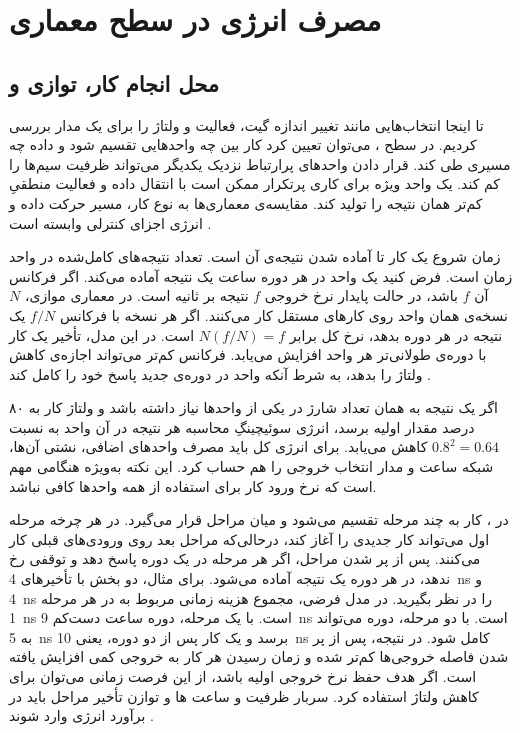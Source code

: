 \section{مصرف انرژی در سطح معماری}
\label{sec:power-architecture}

\subsection{محل انجام کار، توازی و }
\label{sec:power-parallelism-pipeline}

تا اینجا انتخاب‌هایی مانند تغییر اندازه گیت، فعالیت و ولتاژ را
برای یک مدار بررسی کردیم. در سطح ، می‌توان
تعیین کرد کار بین چه واحدهایی تقسیم شود و داده چه مسیری طی کند.
قرار دادن واحدهای پرارتباط نزدیک یکدیگر می‌تواند ظرفیت سیم‌ها را
کم کند. یک واحد ویژه برای کاری پرتکرار ممکن است با انتقال داده
و فعالیت منطقیِ کم‌تر همان نتیجه را تولید کند. مقایسه‌ی معماری‌ها
به نوع کار، مسیر حرکت داده و انرژی اجزای کنترلی وابسته است
\cite[بخش ، صفحه ۲۰۴]{weste}.

 زمان شروع یک کار تا آماده شدن نتیجه‌ی آن است.
 تعداد نتیجه‌های کامل‌شده در واحد زمان است. فرض
کنید یک واحد در هر دوره ساعت یک نتیجه آماده می‌کند. اگر فرکانس آن
\(f\) باشد، در حالت پایدار نرخ خروجی \(f\) نتیجه بر ثانیه است.
در معماری موازی، \(N\) نسخه‌ی همان واحد روی کارهای مستقل کار
می‌کنند. اگر هر نسخه با فرکانس \(f/N\) یک نتیجه در هر دوره
بدهد، نرخ کل برابر \(N(f/N)=f\) است. در این مدل، تأخیر یک کار
با دوره‌ی طولانی‌تر هر واحد افزایش می‌یابد. فرکانس کم‌تر می‌تواند
اجازه‌ی کاهش ولتاژ را بدهد، به شرط آنکه واحد در دوره‌ی جدید پاسخ
خود را کامل کند \cite[بخش  و شکل
، صفحات ۲۰۴ و ۲۰۵]{weste}.

اگر یک نتیجه به همان تعداد شارژ در یکی از واحدها نیاز داشته باشد
و ولتاژ کار به ۸۰ درصد مقدار اولیه برسد، انرژی سوئیچینگِ محاسبه هر
نتیجه در آن واحد به نسبت \(0.8^2=0.64\) کاهش می‌یابد. برای انرژی
کل باید مصرف واحدهای اضافی، نشتی آن‌ها، شبکه ساعت و مدار انتخاب
خروجی را هم حساب کرد. این نکته به‌ویژه هنگامی مهم است که نرخ ورود
کار برای استفاده از همه واحدها کافی نباشد.

در ، کار به چند مرحله تقسیم می‌شود و میان مراحل
 قرار می‌گیرد. در هر چرخه مرحله اول می‌تواند کار
جدیدی را آغاز کند، درحالی‌که مراحل بعد روی ورودی‌های قبلی کار
می‌کنند. پس از پر شدن مراحل، اگر هر مرحله در یک دوره پاسخ دهد
و توقفی رخ ندهد، در هر دوره یک نتیجه آماده می‌شود. برای مثال،
دو بخش با تأخیرهای \qty{4}{\nano\second} و
\qty{4}{\nano\second} را در نظر بگیرید. در مدل فرضی، مجموع
هزینه زمانی مربوط به  در هر مرحله
\qty{1}{\nano\second} است. با یک مرحله، دوره ساعت دست‌کم
\qty{9}{\nano\second} است. با دو مرحله، دوره می‌تواند به
\qty{5}{\nano\second} برسد و یک کار پس از دو دوره، یعنی
\qty{10}{\nano\second} کامل شود. در نتیجه، پس از پر شدن
 فاصله خروجی‌ها کم‌تر شده و زمان رسیدن هر کار به
خروجی کمی افزایش یافته است. اگر هدف حفظ نرخ خروجی اولیه باشد،
از این فرصت زمانی می‌توان برای کاهش ولتاژ استفاده کرد. سربار
ظرفیت و ساعت ها و توازن تأخیر مراحل باید در برآورد
انرژی وارد شوند \cite[بخش ، صفحه ۲۰۵]{weste}.

